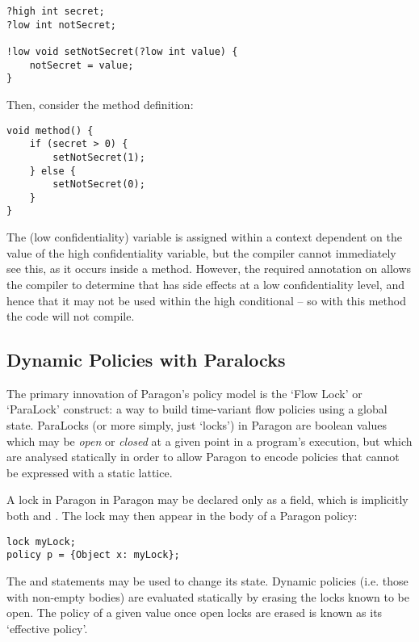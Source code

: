 \begin{verbatim}
?high int secret;
?low int notSecret;

!low void setNotSecret(?low int value) {
	notSecret = value;
}
\end{verbatim}

Then, consider the method definition:

\begin{verbatim}
void method() {
	if (secret > 0) {
		setNotSecret(1);
	} else {
		setNotSecret(0);
	}
}
\end{verbatim}

The (low confidentiality)  variable is assigned within a context dependent on the value of the high confidentiality  variable, but the compiler cannot immediately see this, as it occurs inside a method. However, the required  annotation on  allows the compiler to determine that  has side effects at a low confidentiality level, and hence that it may not be used within the high conditional -- so with this method the code will not compile.

\subsection{Dynamic Policies with Paralocks}

The primary innovation of Paragon's policy model is the `Flow Lock' or `ParaLock' construct: a way to build time-variant flow policies using a global state. ParaLocks (or more simply, just `locks') in Paragon are boolean values which may be \textit{open} or \textit{closed} at a given point in a program's execution, but which are analysed statically in order to allow Paragon to encode policies that cannot be expressed with a static lattice.

A lock in Paragon in Paragon may be declared only as a field, which is implicitly both  and . The lock may then appear in the body of a Paragon policy:

\begin{verbatim}
lock myLock;
policy p = {Object x: myLock};
\end{verbatim}

The  and  statements may be used to change its state. Dynamic policies (i.e. those with non-empty bodies) are evaluated statically by erasing the locks known to be open. The policy of a given value once open locks are erased is known as its `effective policy'.

